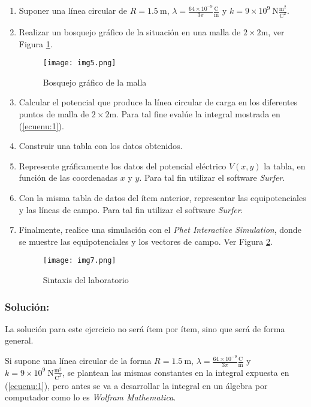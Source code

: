 \begin{multicols}{2}
\begin{enumerate}[leftmargin=15pt]
    \item Suponer una línea circular de $R = 1.5~\mathrm{m}$, $\lambda = \frac{64 \times 10^{-9}}{3\pi} \frac{\mathrm{C}}{\mathrm{m}}$ y $k = 9 \times 10^{9}~\mathrm{N}\frac{\mathrm{m}^{2}}{\mathrm{C}^{2}}$.
    \item Realizar un bosquejo gráfico de la situación en una malla de $2 \times 2 \mathrm{m}$, ver Figura \ref{figenu:2}.
    \begin{figure}[H]
    \begin{center}
    \texttt{[image: img5.png]}
    \caption{Bosquejo gráfico de la malla}
    \label{figenu:2}
    \end{center}
    \end{figure}
    \item Calcular el potencial que produce la línea circular de carga en los diferentes puntos de malla de $2 \times 2 \mathrm{m}$. Para tal fine evalúe la integral mostrada en (\ref{ecuenu:1}).
    \item Construir una tabla con los datos obtenidos.
    \item Represente gráficamente los datos del potencial eléctrico $V(x,y)$ la tabla, en función de las coordenadas $x$ y $y$. Para tal fin utilizar el software \textit{Surfer}.
    \item Con la misma tabla de datos del ítem anterior, representar las equipotenciales y las líneas de campo. Para tal fin utilizar el software \textit{Surfer}.
    \item Finalmente, realice una simulación con el \textit{Phet Interactive Simulation}, donde se muestre las equipotenciales y los vectores de campo. Ver Figura \ref{figenu:3}.
    \begin{figure}[H]
    \begin{center}
    \texttt{[image: img7.png]}
    \caption{Sintaxis del laboratorio}
    \label{figenu:3}
    \end{center}
    \end{figure}
\end{enumerate}

\subsubsection*{Solución:}

La solución para este ejercicio no será ítem por ítem, sino que será de forma general.

Si supone una línea circular de la forma $R = 1.5~\mathrm{m}$, $\lambda = \frac{64 \times 10^{-9}}{3\pi} \frac{\mathrm{C}}{\mathrm{m}}$ y $k = 9 \times 10^{9}~\mathrm{N}\frac{\mathrm{m}^{2}}{\mathrm{C}^{2}}$, se plantean las mismas constantes en la integral expuesta en (\ref{ecuenu:1}), pero antes se va a desarrollar la integral en un álgebra por computador como lo es \textit{Wolfram Mathematica}.




\end{multicols}

